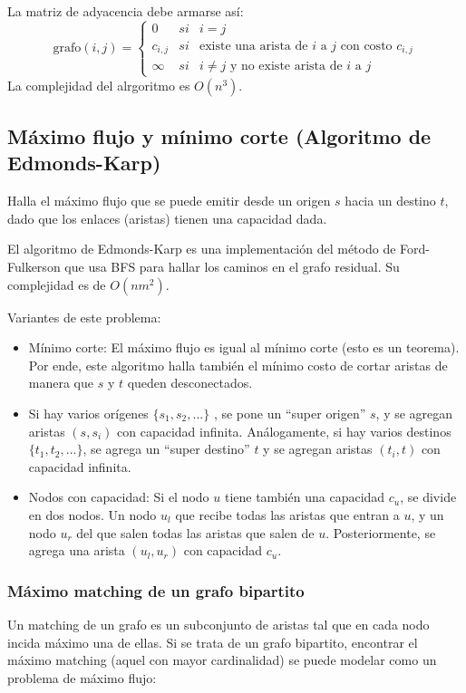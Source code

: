 \documentclass{article}
\begin{document}
\begin{multicols}{2}
	La matriz de adyacencia debe armarse así:
	\[
		\text{grafo}(i, j) = \left \{ 
			\begin{array}{lcc}
				0 & si & i = j
				\\ c_{i,j} & si & \text{existe una arista de } i \text{ a } j \text{ con costo } c_{i,j}
				\\ \infty & si & i \neq j \text{ y no existe arista de } i \text{ a } j 
			\end{array}
		\right.
	\]
	La complejidad del alrgoritmo es \( O(n^3) \).
	

	\subsection{Máximo flujo y mínimo corte (Algoritmo de Edmonds-Karp)}
	Halla el máximo flujo que se puede emitir desde un origen \( s \) hacia un destino \( t \), dado que los enlaces (aristas) tienen una capacidad dada.
	
	El algoritmo de Edmonds-Karp es una implementación del método de Ford-Fulkerson que usa BFS para hallar los caminos en el grafo residual. Su complejidad es de \( O(nm^2) \).
	
	Variantes de este problema:	
	
	\begin{itemize}
		\item Mínimo corte: El máximo flujo es igual al mínimo corte (esto es un teorema). Por ende, este algoritmo halla también el mínimo costo de cortar aristas de manera que \( s \) y \( t \) queden desconectados.
		\item Si hay varios orígenes \( \{s_1, s_2, ...\} \) , se pone un ``super origen'' \( s \), y se agregan aristas \( (s, s_i) \) con capacidad infinita. Análogamente, si hay varios destinos \( \{t_1, t_2, ...\} \), se agrega un ``super destino'' \( t \) y se agregan aristas \( (t_i, t) \) con capacidad infinita.
		\item Nodos con capacidad: Si el nodo \( u \) tiene también una capacidad \( c_u \), se divide en dos nodos. Un nodo \( u_l\) que recibe todas las aristas que entran a \( u \), y un nodo \( u_r \) del que salen todas las aristas que salen de \( u \). Posteriormente, se agrega una arista \( (u_l, u_r) \) con capacidad \( c_u \).
	\end{itemize}
	
	
	
	\subsubsection{Máximo matching de un grafo bipartito}
	Un matching de un grafo es un subconjunto de aristas tal que en cada nodo incida máximo una de ellas. Si se trata de un grafo bipartito, encontrar el máximo matching (aquel con mayor cardinalidad) se puede modelar como un problema de máximo flujo: 
	

\end{multicols}
\end{document}
